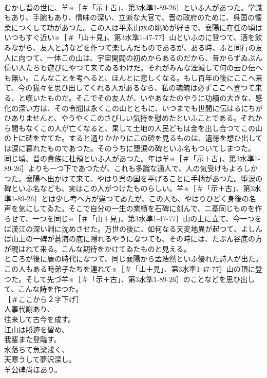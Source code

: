 \documentclass[8pt]{extreport}
\begin{document}
\begin{CJK}{UTF8}{min}
\\	むかし晋の世に、羊※［＃「示＋古」、第3水準1-89-26］といふ人があつた。学識もあり、手腕もあり、情味の深い、立派な大官で、晋の政府のために、呉国の懐柔につくして功があつた。この人は平素山水の眺めが好きで、襄陽に在任の頃はいつもすぐ近い※［＃「山＋見」、第3水準1-47-77］山といふのに登つて、酒を飲みながら、友人と詩などを作つて楽しんだものであるが、ある時、ふと同行の友人に向つて、一体この山は、宇宙開闢の初めからあるのだから、昔からずゐぶん偉い人たちも遊びにやつて来てゐるわけだ。それがみんな湮滅して何の云ひ伝へも無い。こんなことを考へると、ほんとに悲しくなる。もし百年の後にここへ来て、今の我々を思ひ出してくれる人があるなら、私の魂魄は必ずここへ登つて来る、と嘆いたものだ。そこでその友人が、いやあなたのやうに功績の大きな、感化の深い方は、その令聞は永くこの山とともに、いつまでも世間に伝はるにちがひありませんと、やうやくこのさびしい気持を慰めたといふことである。それから間もなくこの人が亡くなると、果して土地の人民どもは金を出し合つてこの山の上に碑を立てた。すると通りかかりにこの碑を見るものは、遺徳を想ひ出しては涙に暮れたものであつた。そのうちに堕涙の碑といふ名もついてしまつた。
\\	同じ頃、晋の貴族に杜預といふ人があつた。年は羊※［＃「示＋古」、第3水準1-89-26］よりも一つ下であつたが、これも多識な通人で、人の気受けもよろしかつた。襄陽へ出かけて来て、やはり呉の国を平げることに手柄があつた。堕涙の碑といふ名なども、実はこの人がつけたものらしい。羊※［＃「示＋古」、第3水準1-89-26］とは少し考へ方が違つてゐたが、この人も、やはりひどく身後の名声を気にしてゐた。そこで自分の一生の業績を石碑に刻んで、二基同じものを作らせて、一つを同じ※［＃「山＋見」、第3水準1-47-77］山の上に立て、今一つをば漢江の深い淵に沈めさせた。万世の後に、如何なる天変地異が起つて、よしんば山上の一碑が蒼海の底に隠れるやうになつても、その時には、たぶん谷底の方が現はれて来る。こんな期待をかけてゐたものと見える。
\\	ところが後に唐の時代になつて、同じ襄陽から孟浩然といふ優れた詩人が出た。この人もある時弟子たちを連れて※［＃「山＋見」、第3水準1-47-77］山の頂に登つた。そして先づ羊※［＃「示＋古」、第3水準1-89-26］のことなどを思ひ出して、こんな詩を作つた。
\\	［＃ここから２字下げ］
\\	人事代謝あり、
\\	往来して古今を成す。
\\	江山は勝迹を留め、
\\	我輩また登臨す。
\\	水落ちて魚梁浅く、
\\	天寒うして夢沢深し。
\\	羊公碑尚ほあり。

\end{CJK}
\end{document}

